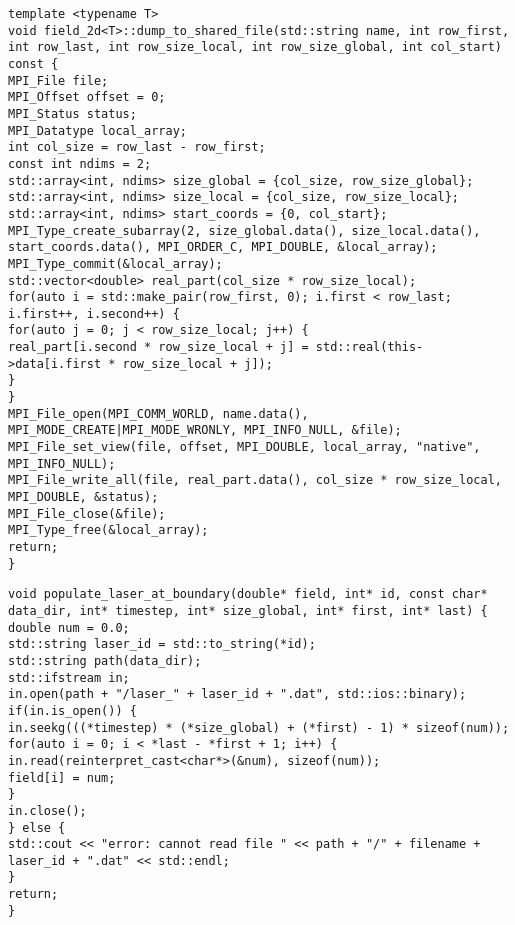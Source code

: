 \begin{lstlisting}[style=CXX, caption=Method for dumping data into shared file]
template <typename T>
void field_2d<T>::dump_to_shared_file(std::string name, int row_first, int row_last, int row_size_local, int row_size_global, int col_start) const {
MPI_File file;
MPI_Offset offset = 0;
MPI_Status status;
MPI_Datatype local_array;
int col_size = row_last - row_first;
const int ndims = 2;
std::array<int, ndims> size_global = {col_size, row_size_global};
std::array<int, ndims> size_local = {col_size, row_size_local};
std::array<int, ndims> start_coords = {0, col_start};
MPI_Type_create_subarray(2, size_global.data(), size_local.data(), start_coords.data(), MPI_ORDER_C, MPI_DOUBLE, &local_array);
MPI_Type_commit(&local_array);
std::vector<double> real_part(col_size * row_size_local);
for(auto i = std::make_pair(row_first, 0); i.first < row_last; i.first++, i.second++) {
for(auto j = 0; j < row_size_local; j++) {
real_part[i.second * row_size_local + j] = std::real(this->data[i.first * row_size_local + j]);
}
}
MPI_File_open(MPI_COMM_WORLD, name.data(), MPI_MODE_CREATE|MPI_MODE_WRONLY, MPI_INFO_NULL, &file);
MPI_File_set_view(file, offset, MPI_DOUBLE, local_array, "native", MPI_INFO_NULL);
MPI_File_write_all(file, real_part.data(), col_size * row_size_local, MPI_DOUBLE, &status);
MPI_File_close(&file);
MPI_Type_free(&local_array);
return;
}
\end{lstlisting}

\hspace{1cm}

\begin{lstlisting}[style=CXX, caption=Extern C++ function to fill Fortran arrays with laser fields dumped in binary file]
void populate_laser_at_boundary(double* field, int* id, const char* data_dir, int* timestep, int* size_global, int* first, int* last) {
double num = 0.0;
std::string laser_id = std::to_string(*id);
std::string path(data_dir);
std::ifstream in;
in.open(path + "/laser_" + laser_id + ".dat", std::ios::binary);
if(in.is_open()) {
in.seekg(((*timestep) * (*size_global) + (*first) - 1) * sizeof(num));
for(auto i = 0; i < *last - *first + 1; i++) {
in.read(reinterpret_cast<char*>(&num), sizeof(num));
field[i] = num;
}
in.close();
} else {
std::cout << "error: cannot read file " << path + "/" + filename + laser_id + ".dat" << std::endl;
}
return;
}
\end{lstlisting}

